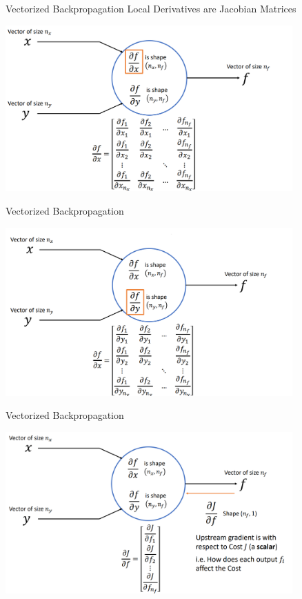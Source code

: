 \documentclass[serif, aspectratio=169]{beamer}
\begin{document}
\begin{frame}{Vectorized Backpropagation}
    Local Derivatives are Jacobian Matrices
    \begin{center}
        \includegraphics[width=11cm]{pic/vec.png}  
    \end{center}
\end{frame}

\begin{frame}{Vectorized Backpropagation}
    \begin{center}
        \includegraphics[width=11cm]{pic/vec3.png}  
    \end{center}
\end{frame}

\begin{frame}{Vectorized Backpropagation}
    \begin{center}
        \includegraphics[width=11cm]{pic/vec4.png}  
    \end{center}
\end{frame}
\end{document}
